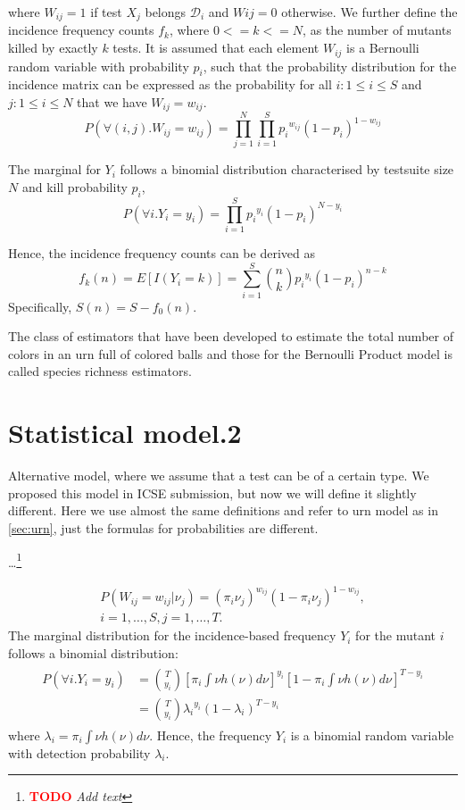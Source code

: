 \documentclass[conference]{IEEEtran}
\newcounter{todocounter}
\newcommand{\todo}[1]{\marginpar{$|$}\textcolor{red}{\stepcounter{todocounter}\footnote[\thetodocounter]{\textcolor{red}{\textbf{TODO }}\textit{#1}}}}
\begin{document}
where $W_{ij} = 1$ if test $X_j$ belongs $\mathcal{D}_i$ and $Wij = 0$ otherwise.
We further define the incidence frequency counts $f_k$, where $0 <= k <= N$, as the number of mutants killed by exactly $k$ tests.
It is assumed that each element $W_{ij}$ is a Bernoulli random variable with probability $p_i$,
such that the probability distribution for the incidence matrix can be expressed as the probability for all $i:1\leq i \leq S $ and $j:1\leq i\leq N$ that we have $W_{ij} = w_{ij}$.
\[
    P\left(\forall (i,j).W_{ij}=w_{ij} \right)= \prod_{j=1}^{N}\prod_{i=1}^{S} {p_i}^{w_{ij}} (1-p_i)^{1-w_{ij}}
\]


The marginal for $Y_i$ follows a binomial distribution characterised by testsuite size $N$ and kill probability $p_i$,
\[
    P\left(\forall i.Y_i=y_i \right)= \prod_{i=1}^{S} {p_i}^{y_i} (1-p_i)^{N-y_i}
\]

Hence, the incidence frequency counts can be derived as
\[
    f_k(n)=E\left[ I(Y_i=k) \right]=\sum_{i=1}^{S} {n \choose k}{p_i}^{y_i} (1-p_i)^{n-k}
\]
Specifically, $S(n)=S-f_0(n)$.

The class of estimators that have been developed to estimate the total number of colors in an urn full of colored balls and those for the Bernoulli Product model is called species richness estimators.

\section{Statistical model.2}
\begin{tcolorbox}[boxrule=0.5pt, arc=4pt, boxsep=0pt, width=\columnwidth]
    Alternative model, where we assume that a test can be of a certain type.
    We proposed this model in ICSE submission, but now we will define it slightly different.
    Here we use almost the same definitions and refer to urn model as in \cref{sec:urn}, just the formulas for probabilities are different.
\end{tcolorbox}
\ldots\todo{Add text}

\begin{multline*}
        P(W_{ij}=w_{ij}|\nu_j)=(\pi_i \nu_j)^{w_{ij}}(1-\pi_i \nu_j)^{1-w_{ij}}, \\
        i=1, \dots, S, j=1,\dots, T.
\end{multline*}
The marginal distribution for the incidence-based frequency $Y_i$ for the mutant $i$
follows a binomial distribution:
\begin{gather*}
    \begin{split}
    P(\forall i.Y_i=y_i)&={T \choose y_i}\left[\pi_i\int \nu h(\nu) d\nu\right]^{y_i} \left[1-\pi_i\int \nu h(\nu) d\nu \right]^{T-y_i} \\
    &={T \choose y_i}{\lambda_i}^{y_i} (1-\lambda_i)^{T-{y_i}}
    \end{split}
\end{gather*}
where  $\lambda_i=\pi_i \int \nu h(\nu)d\nu$.
Hence, the frequency $Y_i$ is a binomial random variable with detection probability ${\lambda_i}$. %
\end{document}
